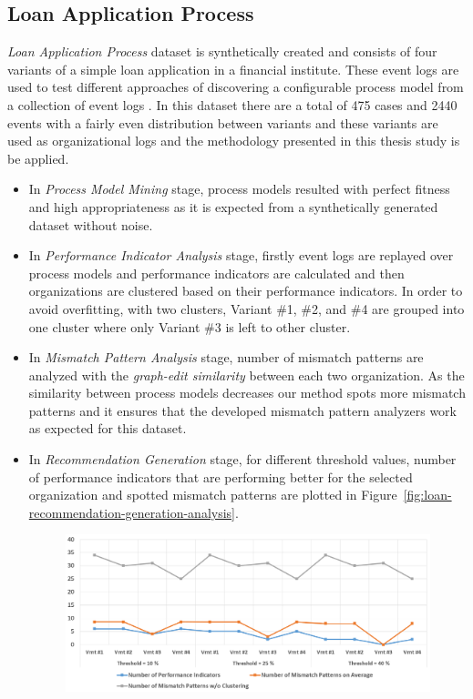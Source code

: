 \subsection{Loan Application Process}
\label{subsec:loan-app-process}
\textit{Loan Application Process} dataset is synthetically created and consists of four variants of a simple loan application in a financial institute. These event logs are used to test different approaches of discovering a configurable process model from a collection of event logs \cite{buijs2014flexible}. In this dataset there are a total of 475 cases and 2440 events with a fairly even distribution between variants and these variants are used as organizational logs and the methodology presented in this thesis study is be applied.

\begin{itemize}
  \item In \textit{Process Model Mining} stage, process models resulted with perfect fitness and high appropriateness as it is expected from a synthetically generated dataset without noise.
  \item In \textit{Performance Indicator Analysis} stage, firstly event logs are replayed over process models and performance indicators are calculated and then organizations are clustered based on their performance indicators. In order to avoid overfitting,  with two clusters, Variant \#1, \#2, and \#4 are grouped into one cluster where only Variant \#3 is left to other cluster. 
  \item In \textit{Mismatch Pattern Analysis} stage, number of mismatch patterns are analyzed with the \textit{graph-edit similarity} between each two organization. As the similarity between process models decreases our method spots more mismatch patterns and it ensures that the developed mismatch pattern analyzers work as expected for this dataset. 
  \item In \textit{Recommendation Generation} stage, for different threshold values, number of performance indicators that are performing better for the selected organization and spotted mismatch patterns are plotted in Figure~\ref{fig:loan-recommendation-generation-analysis}. 
    \begin{figure}
    	\centering
    	\includegraphics[width=\textwidth]{5_results_discussions/loan-application-process/recommendation-generation-analysis}

\end{figure}
\end{itemize}
